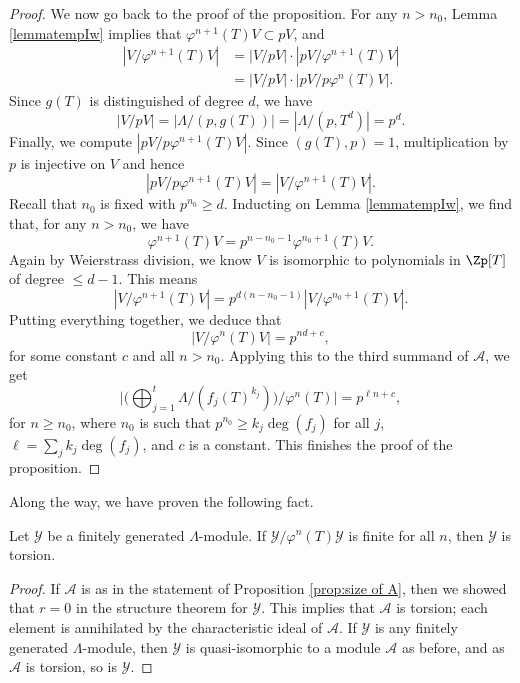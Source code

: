 \documentclass[a4paper,10pt, english, reqno]{smfart}
\numberwithin{equation}{section}
\begin{document}
\begin{proof}
We now go back to the proof of the proposition. For any $n> n_0$, Lemma \ref{lemmatempIw} implies that $\varphi^{n+1}(T)V \subset pV$, and
\begin{align*} | V / \varphi^{n+1}(T) V | &= |V/pV| \cdot |pV/\varphi^{n+1}(T)V|\\ 
&= |V / p V | \cdot | p V / p \varphi^{n}(T) V |.
\end{align*}
Since $g(T)$ is distinguished of degree $d$, we have
\[ |V / p V | = | \Lambda / (p, g(T)) | = | \Lambda / (p, T^d) | = p^{d}. \]
Finally, we compute $| p V / p\varphi^{n + 1}(T) V |$. Since $(g(T), p) = 1$, multiplication by $p$ is injective on $V$ and hence 
\[
    | p V / p \varphi^{n + 1}(T) V | = | V / \varphi^{n + 1}(T) V |.
\]
Recall that $n_0$ is fixed with $p^{n_0} \geq d$. Inducting on Lemma \ref{lemmatempIw}, we find that, for any $n > n_0$, we have 
\[
    \varphi^{n + 1}(T)V = p^{n-n_0-1}\varphi^{n_0+1}(T)V.
\]
Again by Weierstrass division, we know $V$ is isomorphic to polynomials in $\Zp[T]$ of degree $\leq d-1$. This means
\[ | V / \varphi^{n + 1}(T) V | = p^{d (n - n_0 - 1)} | V / \varphi^{n_0 + 1}(T) V|. \]
Putting everything together, we deduce that
\[ | V / \varphi^{n}(T) V | = p^{nd + c},\] for some constant $c$ and all $n > n_0$. Applying this to the third summand of $\mathscr{A}$, we get
\[ 
\bigg| \bigg(\bigoplus_{j = 1}^t \Lambda / (f_j(T)^{k_j})\bigg)\Big / \varphi^n(T) \bigg| = p^{\ell n + c}, 
\] for $n \geq n_0$, where $n_0$ is such that $p^{n_0} \geq k_j\deg(f_j)$ for all $j$, $\ell = \sum_j k_j \deg(f_j)$, and $c$ is a constant. This finishes the proof of the proposition.
\end{proof}

Along the way, we have proven the following fact.

\begin{corollary} \label{Iwtor}
Let $\mathscr{Y}$ be a finitely generated $\Lambda$-module. If $\mathscr{Y} / \varphi^n(T) \mathscr{Y}$ is finite for all $n$, then $\mathscr{Y}$ is torsion.
\end{corollary}

\begin{proof}
If $\mathscr{A}$ is as in the statement of Proposition \ref{prop:size of A}, then we showed that $r = 0$ in the structure theorem for $\mathscr{Y}$. This implies that $\mathscr{A}$ is torsion; each element is annihilated by the characteristic ideal of $\mathscr{A}$. If $\mathscr{Y}$ is any finitely generated $\Lambda$-module, then $\mathscr{Y}$ is quasi-isomorphic to a module $\mathscr{A}$ as before, and as $\mathscr{A}$ is torsion, so is $\mathscr{Y}$.
\end{proof}
\end{document}

